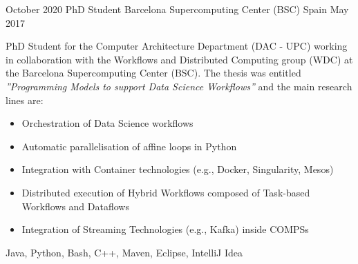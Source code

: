 %
%
%


\begin{experiences}
    \experience
        {October 2020}
        {PhD Student}
        {Barcelona Supercomputing Center (BSC)}
        {Spain}
        {May 2017}
        {PhD Student for the Computer Architecture Department (DAC - UPC) working in collaboration with the Workflows and Distributed Computing group (WDC) at the Barcelona Supercomputing Center (BSC). The thesis was entitled \textit{''Programming Models to support Data Science Workflows''} and the main research lines are:
        \begin{itemize}
            \item Orchestration of Data Science workflows
            \item Automatic parallelisation of affine loops in Python
            \item Integration with Container technologies (e.g., Docker, Singularity, Mesos)
            \item Distributed execution of Hybrid Workflows composed of Task-based Workflows and Dataflows
            \item Integration of Streaming Technologies (e.g., Kafka) inside COMPSs
        \end{itemize}
        }
        {Java, Python, Bash, C++, Maven, Eclipse, IntelliJ Idea}
    \emptySeparator
    \experience

\end{experiences}
